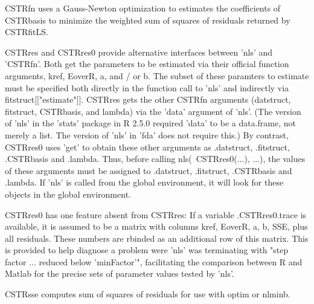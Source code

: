 \begin{Details}
CSTRfn uses a Gauss-Newton optimization to estimates the coefficients
of CSTRbasis to minimize the weighted sum of squares of residuals
returned by CSTRfitLS.  

CSTRres and CSTRres0 provide alternative interfaces between 'nls' and
'CSTRfn'.  Both get the parameters to be estimated via their official
function arguments, kref, EoverR, a, and / or b.  The subset of these
paramters to estimate must be specified both directly in the function
call to 'nls' and indirectly via fitstruct[["estimate"]].  CSTRres
gets the other CSTRfn arguments (datstruct, fitstruct, CSTRbasis, and
lambda) via the 'data' argument of 'nls'.  (The version of 'nls' in
the 'stats' package in R 2.5.0 required 'data' to be a data.frame, not
merely a list.  The version of 'nls' in 'fda' does not require this.)
By contrast, CSTRres0 uses 'get' to obtain these other arguments as
.datstruct, .fitstruct, .CSTRbasis and .lambda.  Thus, before calling
nls(~CSTRres0(...), ...), the values of these arguments must be
assigned to .datstruct, .fitstruct, .CSTRbasis and .lambda.  If 'nls'
is called from the global environment, it will look for these objects
in the global environment.

CSTRres0 has one feature absent from CSTRres:  If a variable
.CSTRres0.trace is available, it is assumed to be a matrix with columns
kref, EoverR, a, b, SSE, plus all residuals.  These numbers are
rbinded as an additional row of this matrix.  This is provided to help
diagnose a problem were 'nls' was terminating with "step factor
... reduced below 'minFactor'", facilitating the comparison between R
and Matlab for the precise sets of parameter values tested by 'nls'.    

CSTRsse computes sum of squares of residuals for use with optim or
nlminb.
\end{Details}
